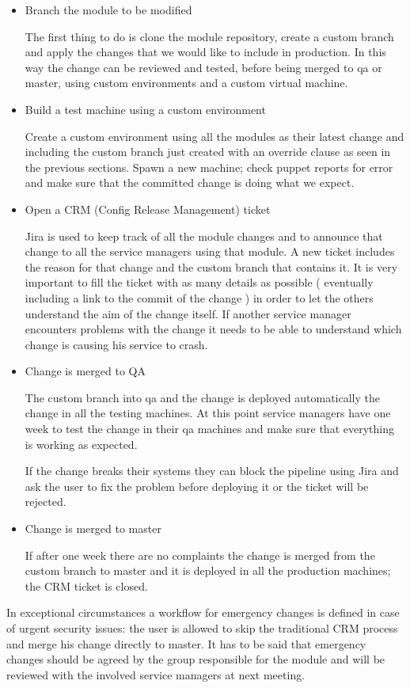 \begin{itemize}

\item Branch the module to be modified

The first thing to do is clone the module repository, create a custom
branch and apply the changes that we would like to include in production.
In this way the change can be reviewed and tested, before being merged to
qa or master, using custom environments and a custom virtual machine.

\item Build a test machine using a custom environment

Create a custom environment using all the modules as their latest change
and including the custom branch just created with an override clause as
seen in the previous sections. Spawn a new machine; check puppet reports
for error and make sure that the committed change is doing what we expect.

\item Open a CRM (Config Release Management) ticket

Jira is used to keep track of all the module changes and to announce that
change to all the service managers using that module. A new ticket
includes the reason for that change and the custom branch that contains
it. It is very important to fill the ticket with as many details as
possible ( eventually including a link to the commit of the change ) in
order to let the others understand the aim of the change itself. If
another service manager encounters problems with the change it needs to be
able to understand which change is causing his service to crash.

\item Change is merged to QA

The custom branch into qa and the change is deployed automatically the
change in all the testing machines. At this point service managers have
one week to test the change in their qa machines and make sure that
everything is working as expected.

If the change breaks their systems they can block the pipeline using Jira
and ask the user to fix the problem before deploying it or the ticket will
be rejected.

\item Change is merged to master

If after one week there are no complaints the change is merged from the
custom branch to master and it is deployed in all the production machines;
the CRM ticket is closed.

\end{itemize}

In exceptional circumstances a workflow for emergency changes is defined in
case of urgent security issues: the user is allowed to skip the traditional CRM
process and merge his change directly to master. It has to be said that
emergency changes should be agreed by the group responsible for the module and
will be reviewed with the involved service managers at next meeting.

